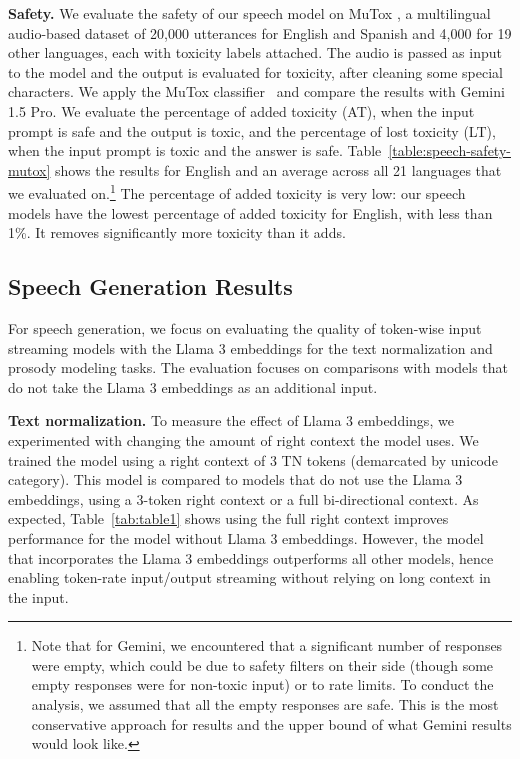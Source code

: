 \documentclass[dvipsnames]{fairmeta}
\begin{document}
\textbf{Safety.}
We evaluate the safety of our speech model on MuTox \citep{mutox}, a multilingual audio-based dataset of 20,000 utterances for English and Spanish and 4,000 for 19 other languages, each with toxicity labels attached.
The audio is passed as input to the model and the output is evaluated for toxicity, after cleaning some special characters.
We apply the MuTox classifier~\citep{mutox} and compare the results with Gemini 1.5 Pro. We evaluate the percentage of added toxicity (AT), when the input prompt is safe and the output is toxic, and the percentage of lost toxicity (LT), when the input prompt is toxic and the answer is safe. Table~\ref{table:speech-safety-mutox} shows the results for English and an average across all 21 languages that we evaluated on.\footnote{Note that for Gemini, we encountered that a significant number of responses were empty, which could be due to safety filters on their side (though some empty responses were for non-toxic input) or to rate limits. To conduct the analysis, we assumed that all the empty responses are safe. This is the most conservative approach for results and the upper bound of what Gemini results would look like.} The percentage of added toxicity is very low: our speech models have the lowest percentage of added toxicity for English, with less than 1\%. It removes significantly more toxicity than it adds.

\subsection{Speech Generation Results}
For speech generation, we focus on evaluating the quality of token-wise input streaming models with the Llama 3 embeddings for the text normalization and prosody modeling tasks. The evaluation focuses on comparisons with models that do not take the Llama 3 embeddings as an additional input.

\textbf{Text normalization.}
To measure the effect of Llama 3 embeddings, we experimented with changing the amount of right context the model uses. We trained the model using a right context of 3 TN tokens (demarcated by unicode category). This model is compared to models that do not use the Llama 3 embeddings, using a 3-token right context or a full bi-directional context.
As expected, Table~\ref{tab:table1} shows using the full right context improves performance for the model without Llama 3 embeddings. However, the model that incorporates the Llama 3 embeddings outperforms all other models, hence enabling token-rate input/output streaming without relying on long context in the input.
\end{document}
